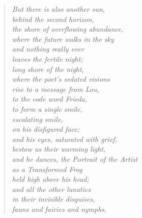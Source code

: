 \begin{verse}
\itshape
But there is also another sun,\\
behind the second horizon,\\
the shore of overflowing abundance,\\
where the future walks in the sky\\
and nothing really ever\\
leaves the fertile night;\\
long shore of the night,\\
where the poet's sedated visions\\
rise to a message from Lou,\\
to the code word {\upshape Frieda,}\\
to form a single smile,\\
escalating smile,\\
on his disfigured face;\\
and his eyes, saturated with grief,\\
bestow us their warming light,\\
and he dances, the {\upshape Portrait of the Artist}\\
as a Transformed Frog\\
held high above his head;\\
and all the other lunatics\\
in their invisible disguises,\\
fauns and fairies and nymphs,\\
\end{verse}

\clearpage

